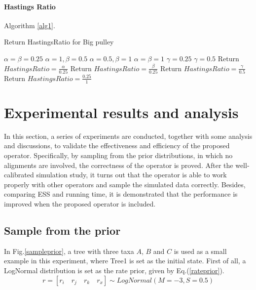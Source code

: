 \documentclass{bmcart}
\begin{document}
\paragraph*{Hastings Ratio}
Algorithm \ref{alg1}.
\begin{algorithm}
\caption{Return HastingsRatio for Big pulley}
\label{alg1}
\begin{algorithmic}[1]
\STATE $\alpha  = \beta  = 0.25$
\STATE $\alpha  = 1,\beta  = 0.5$
\STATE $\alpha  = 0.5,\beta  = 1$
\STATE $\alpha  = \beta  = 1$
\ENDIF
{}
\STATE $\gamma  = 0.25$
\ELSE
\STATE $\gamma  = 0.5$
\ENDIF
{}
\STATE Return $HastingsRatio = \frac{\alpha }{{0.25}}$
\ENDFOR
{}
\STATE Return $HastingsRatio = \frac{\beta }{{0.25}}$
\ENDFOR
{}
\STATE Return $HastingsRatio = \frac{\gamma }{{0.5}}$
\ENDFOR
{}
\STATE Return $HastingsRatio = \frac{{0.25}}{1}$
\ENDFOR
\end{algorithmic}
\end{algorithm}
\section*{Experimental results and analysis}
In this section, a series of experiments are conducted, together with some analysis and discussions, to validate the effectiveness and efficiency of the proposed operator. Specifically, by sampling from the prior distributions, in which no alignments are involved, the correctness of the operator is proved. After the well-calibrated simulation study, it turns out that the operator is able to work properly with other operators and sample the simulated data correctly. Besides, comparing ESS and running time, it is demonstrated that the performance is improved when the proposed operator is included.

\subsection*{Sample from the prior}
In Fig.\ref{sampleprior}, a tree with three taxa $A$, $B$ and $C$  is used as a small example in this experiment, where Tree1 is set as the initial state. First of all, a LogNormal distribution is set as the rate prior, given by Eq.(\ref{rateprior}).
\begin{equation}\label{rateprior}
r = [{r_i}\quad{r_j}\quad{r_k}\quad{r_x}] \sim LogNormal(M = -3, S = 0.5)
\end{equation}
\end{document}
